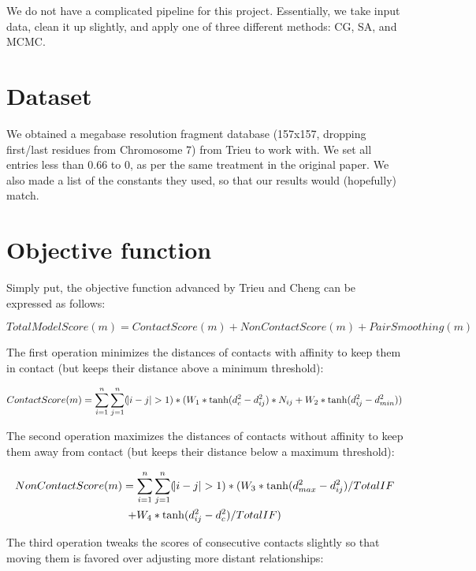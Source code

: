 \documentclass{article}
\begin{document}
We do not have a complicated pipeline for this project.  Essentially, we take input data, clean it up slightly, and apply one of three different methods: CG, SA, and MCMC.

\section{Dataset}

We obtained a megabase resolution fragment database (157x157, dropping first/last residues from Chromosome 7) from Trieu to work with.  We set all entries less than 0.66 to 0, as per the same treatment in the original paper.  We also made a list of the constants they used, so that our results would (hopefully) match.

\section{Objective function}

Simply put, the objective function advanced by Trieu and Cheng can be expressed as follows:

\begin{equation}
      TotalModelScore(m) = ContactScore(m) + NonContactScore(m) + PairSmoothing(m)
\end{equation}

The first operation minimizes the distances of contacts with affinity to keep them in contact (but keeps their distance above a minimum threshold):

\begin{equation}
      ContactScore(m) = \sum_{i=1}^{n} \sum_{j=1}^{n} (\abs{i-j}>1) * (W_1 * \tanh(d_c^2-d_{ij}^2) * N_{ij} + W_2 * \tanh(d_{ij}^2-d_{min}^2))
\end{equation}

The second operation maximizes the distances of contacts without affinity to keep them away from contact (but keeps their distance below a maximum threshold):

\begin{multline}
      NonContactScore(m) = \sum_{i=1}^{n} \sum_{j=1}^{n} (\abs{i-j}>1) * (W_3 * \tanh(d_{max}^2-d_{ij}^2) / TotalIF \\+ W_4 * \tanh(d_{ij}^2-d_{c}^2) / TotalIF)
\end{multline}

The third operation tweaks the scores of consecutive contacts slightly so that moving them is favored over adjusting more distant relationships:
\end{document}
